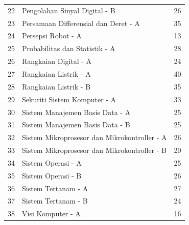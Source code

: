 \begin{longtable}{|c|l|r|}
  22 & Pengolahan Sinyal Digital - B                 & 26 \\
  23 & Persamaan Differensial dan Deret - A          & 35 \\
  24 & Persepsi Robot - A                            & 13 \\
  25 & Probabilitas dan Statistik - A                & 28 \\
  26 & Rangkaian Digital - A                         & 24 \\
  27 & Rangkaian Listrik - A                         & 40 \\
  28 & Rangkaian Listrik - B                         & 35 \\
  29 & Sekuriti Sistem Komputer - A                  & 33 \\
  30 & Sistem Manajemen Basis Data - A               & 25 \\
  31 & Sistem Manajemen Basis Data - B               & 25 \\
  32 & Sistem Mikroprosesor dan Mikrokontroller - A  & 26 \\
  33 & Sistem Mikroprosesor dan Mikrokontroller - B  & 20 \\
  34 & Sistem Operasi - A                            & 25 \\
  35 & Sistem Operasi - B                            & 26 \\
  36 & Sistem Tertanam - A                           & 27 \\
  37 & Sistem Tertanam - B                           & 24 \\
  38 & Visi Komputer - A                             & 16 \\    
  \hline
\end{longtable}

